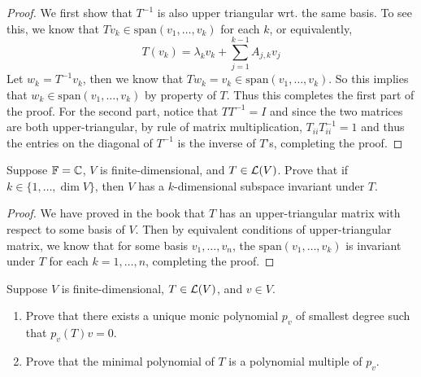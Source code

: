 \documentclass{extarticle}
\begin{document}
\begin{proof}
We first show that \(T^{-1}\) is also upper triangular wrt. the same basis. To see this, we know 
that \(T v_k \in \text{span}(v_1, \ldots, v_k)\) for each \(k\), or equivalently, 
\[T(v_k) = \lambda_k v_k + \sum_{j=1}^{k-1}A_{j,k}v_j\]
Let \(w_k = T^{-1}v_k\), then we know that \(T w_k = v_k \in \text{span}(v_1, \ldots, v_k)\). So this 
implies that \(w_k \in \text{span}(v_1, \ldots, v_k)\) by property of \(T\). Thus this completes the 
first part of the proof. For the second part, notice that \(TT^{-1} = I\) and since the two matrices 
are both upper-triangular, by rule of matrix multiplication, \(T_{ii} T^{-1}_{ii} = 1\) and thus 
the entries on the diagonal of \(T^{-1}\) is the inverse of \(T\)'s, completing the proof.  
\end{proof}

\begin{problem}{6}
    Suppose \(\mathbb{F} = \mathbb{C}\), \(V\) is finite-dimensional, and \(T \in \mathcal{L}(V)\). Prove that if 
    \(k \in \{1, \ldots, \dim V\}\), then \(V\) has a \(k\)-dimensional subspace 
    invariant under \(T\).
\end{problem}

\begin{proof}
We have proved in the book that \(T\) has an upper-triangular matrix with respect to some basis 
of \(V\). Then by equivalent conditions of upper-triangular matrix, we know that for some basis 
\(v_1, \ldots, v_n\), the \(\text{span}(v_1, \ldots, v_k)\) is invariant under \(T\) for each 
\(k = 1, \ldots, n\), completing the proof. 
\end{proof}

\begin{problem}{7}
    Suppose \(V\) is finite-dimensional, \(T \in \mathcal{L}(V)\), and \(v \in V\). 
    \begin{enumerate}[label=(\alph*)]
        \item Prove that there exists a unique monic polynomial \(p_v\) of smallest degree such that 
        \(p_v(T)v = 0\).
        \item Prove that the minimal polynomial of \(T\) is a polynomial multiple of \(p_v\).
    \end{enumerate}
\end{problem}
\end{document}
